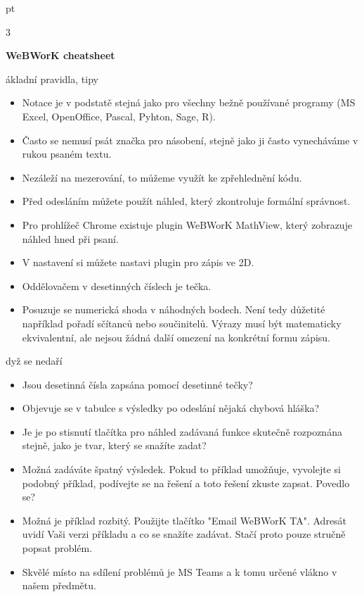 \documentclass[10pt]{article}
\def\nadpis#1\par{\par\bigskip\noindent \textbf{#1} \par}
\begin{document}
 pt
\pagestyle{empty}

\setlength\columnsep{40pt}

\begin{multicols}3
  {\centering \textbf{WeBWorK cheatsheet}

    }

\nadpis Základní pravidla, tipy

\begin{itemize}
\itemsep=-3pt\raggedright
\item Notace je v podstatě stejná jako pro všechny bežně používané programy (MS Excel, OpenOffice, Pascal, Pyhton, Sage, R).
\item Často se nemusí psát značka pro násobení, stejně jako ji často vynecháváme v rukou psaném textu.
\item Nezáleží na mezerování, to můžeme využít ke zpřehlednění kódu.
\item Před odesláním můžete použít náhled, který zkontroluje formální správnost.
\item Pro prohlížeč Chrome existuje plugin WeBWorK MathView, který zobrazuje náhled hned při psaní.
\item V nastavení si můžete nastavi plugin pro zápis ve 2D.
\item Oddělovačem v desetinných číslech je tečka.
\item Posuzuje se numerická shoda v náhodných bodech. Není tedy důžetité například pořadí sčítanců nebo součinitelů. Výrazy musí být matematicky ekvivalentní, ale nejsou žádná další omezení na konkrétní formu zápisu.
\end{itemize}

\nadpis Když se nedaří

\begin{itemize}  \itemsep=-3pt\raggedright
\item Jsou desetinná čísla zapsána pomocí desetinné tečky?
\item 
Objevuje se v tabulce s výsledky po odeslání nějaká chybová hláška?
\item 
Je je po stisnutí tlačítka pro náhled zadávaná funkce skutečně rozpoznána stejně, jako je tvar, který se snažíte zadat?
\item 
Možná zadáváte špatný výsledek. Pokud to příklad umožňuje, vyvolejte si podobný příklad, podívejte se na řešení a toto řešení zkuste zapsat. Povedlo se?
\item 
Možná je příklad rozbitý. Použijte tlačítko "Email WeBWorK TA". Adresát uvidí Vaši verzi příkladu a co se snažíte zadávat. Stačí proto pouze stručně popsat problém.
\item Skvělé místo na sdílení problémů je MS Teams a k tomu určené vlákno v našem předmětu.
\end{itemize}
\vfill \null
\columnbreak


\end{multicols}
\end{document}
